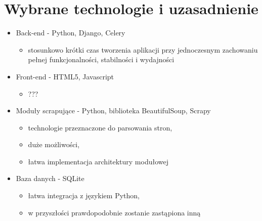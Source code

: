 \documentclass[12pt, titlepage]{article}
\begin{document}
	\section{Wybrane technologie i uzasadnienie}
	\begin{itemize}
		\item Back-end - Python, Django, Celery
		\begin{itemize}
			\item stosunkowo krótki czas tworzenia aplikacji przy jednoczesnym zachowaniu pełnej funkcjonalności, stabilności i wydajności
		\end{itemize}
		\item Front-end - HTML5, Javascript
		\begin{itemize}
			\item ???
		\end{itemize}
		\item Moduły scrapujące - Python, biblioteka BeautifulSoup, Scrapy
		\begin{itemize}
			\item technologie przeznaczone do parsowania stron,
			\item duże możliwości,
			\item łatwa implementacja architektury modułowej
		\end{itemize}
		\item Baza danych - SQLite
		\begin{itemize}
			\item łatwa integracja z językiem Python,
			\item w przyszłości prawdopodobnie zostanie zastąpiona inną
		\end{itemize}
	\end{itemize}
\end{document}
